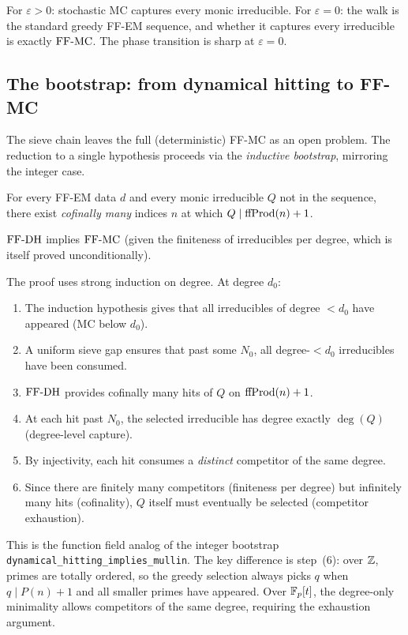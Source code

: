 \begin{theorem}\label{thm:phase-transition}
For $\varepsilon > 0$: stochastic MC captures every monic irreducible.
For $\varepsilon = 0$: the walk is the standard greedy FF-EM sequence, and
whether it captures every irreducible is exactly $\mathrm{FF\text{-}MC}$. The phase
transition is sharp at $\varepsilon = 0$.
\end{theorem}

\subsection{The bootstrap: from dynamical hitting to FF-MC}

The sieve chain leaves the full (deterministic) FF-MC as an open problem.
The reduction to a single hypothesis proceeds via the \emph{inductive
bootstrap}, mirroring the integer case.

\begin{definition}
For every FF-EM data $d$ and every monic irreducible $Q$ not in the
sequence, there exist \emph{cofinally many} indices $n$ at which
$Q \mid \mathrm{ffProd}(n) + 1$.
\end{definition}

\begin{theorem}\label{thm:bootstrap}
$\mathrm{FF\text{-}DH}$ implies $\mathrm{FF\text{-}MC}$ (given the finiteness of irreducibles per degree,
which is itself proved unconditionally).
\end{theorem}

The proof uses strong induction on degree. At degree $d_0$:
\begin{enumerate}
  \item The induction hypothesis gives that all irreducibles of degree $< d_0$
    have appeared (MC below $d_0$).
  \item A uniform sieve gap ensures that past some $N_0$, all degree-$<d_0$
    irreducibles have been consumed.
  \item $\mathrm{FF\text{-}DH}$ provides cofinally many hits of $Q$ on $\mathrm{ffProd}(n) + 1$.
  \item At each hit past $N_0$, the selected irreducible has degree exactly
    $\deg(Q)$ (degree-level capture).
  \item By injectivity, each hit consumes a \emph{distinct} competitor of
    the same degree.
  \item Since there are finitely many competitors (finiteness per degree) but
    infinitely many hits (cofinality), $Q$ itself must eventually be selected
    (competitor exhaustion).
\end{enumerate}

This is the function field analog of the integer bootstrap
\texttt{dynamical\_hitting\_implies\_mullin}. The key difference is step~(6):
over $\mathbb{Z}$, primes are totally ordered, so the greedy selection always picks
$q$ when $q \mid P(n)+1$ and all smaller primes have appeared. Over $\mathbb{F}_p[t]$,
the degree-only minimality allows competitors of the same degree, requiring
the exhaustion argument.


